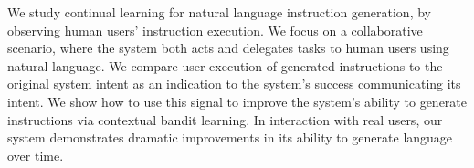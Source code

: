 We study continual learning for natural language instruction generation, by observing human users' instruction execution. We focus on a collaborative scenario, where the system both acts and delegates tasks to human users using natural language. We compare user execution of generated instructions to the original system intent as an indication to the system's success communicating its intent. We show how to use this signal to improve the system's ability to generate instructions via contextual bandit learning. In interaction with real users, our system demonstrates dramatic improvements in its ability to generate language over time.